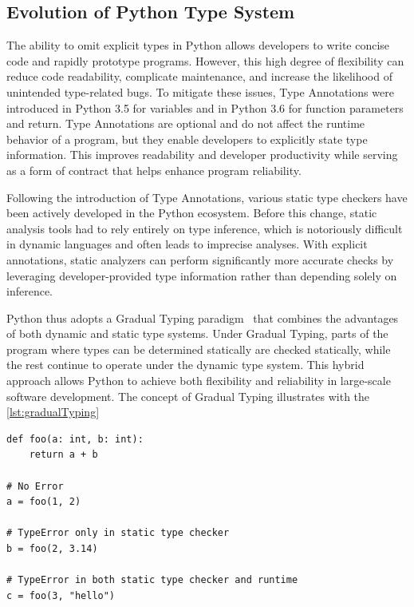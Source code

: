 \subsection{Evolution of Python Type System}
The ability to omit explicit types in Python allows developers to write concise
code and rapidly prototype programs.
However, this high degree of flexibility can reduce code readability,
complicate maintenance, and increase the likelihood of unintended type-related
bugs.
To mitigate these issues, Type Annotations were introduced in Python 3.5 for
variables and in Python 3.6 for function parameters and return.
Type Annotations are optional and do not affect the runtime behavior of a
program, but they enable developers to explicitly state type information.
This improves readability and developer productivity while serving as a form of
contract that helps enhance program reliability.

Following the introduction of Type Annotations, various static type checkers
have been actively developed in the Python ecosystem.
Before this change, static analysis tools had to rely entirely on type
inference, which is notoriously difficult in dynamic languages and often leads
to imprecise analyses.
With explicit annotations, static analyzers can perform significantly more
accurate checks by leveraging developer-provided type information rather than
depending solely on inference.

Python thus adopts a Gradual Typing paradigm~\cite{gradualtyping} that combines
the advantages of both dynamic and static type systems.
Under Gradual Typing, parts of the program where types can be determined
statically are checked statically, while the rest continue to operate under the
dynamic type system.
This hybrid approach allows Python to achieve both flexibility and reliability
in large-scale software development.
The concept of Gradual Typing illustrates with the \autoref{lst:gradualTyping}

\begin{listing}[t]
\begin{verbatim}
def foo(a: int, b: int):
    return a + b

# No Error
a = foo(1, 2) 

# TypeError only in static type checker
b = foo(2, 3.14)

# TypeError in both static type checker and runtime
c = foo(3, "hello")
\end{verbatim}
\caption{Example Python program demonstrating object compatibility determined by duck typing.}
\label{lst:gradualTyping}
\end{listing}

